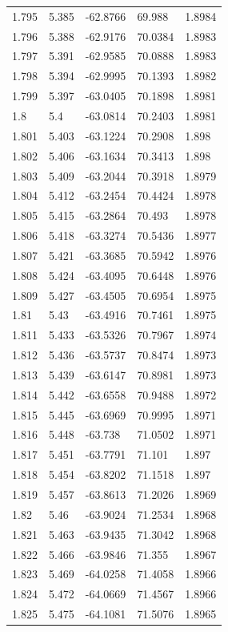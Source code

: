 \begin{tabular}{lllll}
1.795 & 5.385 & -62.8766 & 69.988 & 1.8984 \\
1.796 & 5.388 & -62.9176 & 70.0384 & 1.8983 \\
1.797 & 5.391 & -62.9585 & 70.0888 & 1.8983 \\
1.798 & 5.394 & -62.9995 & 70.1393 & 1.8982 \\
1.799 & 5.397 & -63.0405 & 70.1898 & 1.8981 \\
1.8 & 5.4 & -63.0814 & 70.2403 & 1.8981 \\
1.801 & 5.403 & -63.1224 & 70.2908 & 1.898 \\
1.802 & 5.406 & -63.1634 & 70.3413 & 1.898 \\
1.803 & 5.409 & -63.2044 & 70.3918 & 1.8979 \\
1.804 & 5.412 & -63.2454 & 70.4424 & 1.8978 \\
1.805 & 5.415 & -63.2864 & 70.493 & 1.8978 \\
1.806 & 5.418 & -63.3274 & 70.5436 & 1.8977 \\
1.807 & 5.421 & -63.3685 & 70.5942 & 1.8976 \\
1.808 & 5.424 & -63.4095 & 70.6448 & 1.8976 \\
1.809 & 5.427 & -63.4505 & 70.6954 & 1.8975 \\
1.81 & 5.43 & -63.4916 & 70.7461 & 1.8975 \\
1.811 & 5.433 & -63.5326 & 70.7967 & 1.8974 \\
1.812 & 5.436 & -63.5737 & 70.8474 & 1.8973 \\
1.813 & 5.439 & -63.6147 & 70.8981 & 1.8973 \\
1.814 & 5.442 & -63.6558 & 70.9488 & 1.8972 \\
1.815 & 5.445 & -63.6969 & 70.9995 & 1.8971 \\
1.816 & 5.448 & -63.738 & 71.0502 & 1.8971 \\
1.817 & 5.451 & -63.7791 & 71.101 & 1.897 \\
1.818 & 5.454 & -63.8202 & 71.1518 & 1.897 \\
1.819 & 5.457 & -63.8613 & 71.2026 & 1.8969 \\
1.82 & 5.46 & -63.9024 & 71.2534 & 1.8968 \\
1.821 & 5.463 & -63.9435 & 71.3042 & 1.8968 \\
1.822 & 5.466 & -63.9846 & 71.355 & 1.8967 \\
1.823 & 5.469 & -64.0258 & 71.4058 & 1.8966 \\
1.824 & 5.472 & -64.0669 & 71.4567 & 1.8966 \\
1.825 & 5.475 & -64.1081 & 71.5076 & 1.8965 \\

\end{tabular}
